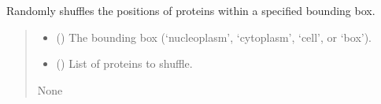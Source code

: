 \documentclass[letterpaper,10pt,english]{sphinxmanual}
\begin{document}
\begin{fulllineitems}
\begin{fulllineitems}
\label{\detokenize{src:src.System_Class.System.shuffle_protein_in_cell}}
\pysigstartsignatures
{}
\pysigstopsignatures
\end{fulllineitems}


\begin{fulllineitems}
\label{\detokenize{src:src.System_Class.System.shuffle_protein_in_cell_nuc}}
\pysigstartsignatures
{}
\pysigstopsignatures
\end{fulllineitems}


\begin{fulllineitems}
\label{\detokenize{src:src.System_Class.System.shuffle_proteins}}
\pysigstartsignatures
{}
\pysigstopsignatures
\sphinxAtStartPar
Randomly shuffles the positions of proteins within a specified bounding box.
\begin{quote}\begin{description}
\begin{itemize}
\item {} 
\sphinxAtStartPar
{} () \textendash{} The bounding box (‘nucleoplasm’, ‘cytoplasm’, ‘cell’, or ‘box’).

\item {} 
\sphinxAtStartPar
{} () \textendash{} List of proteins to shuffle.

\end{itemize}

\sphinxAtStartPar
None

\end{description}\end{quote}


\end{fulllineitems}
\end{fulllineitems}
\end{document}
